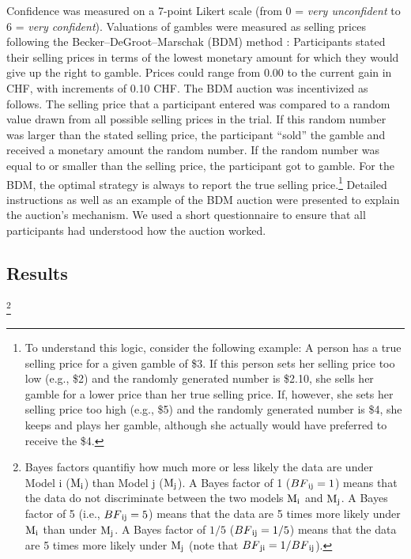 \documentclass[a4paper, man, natbib, floatsintext]{apa6}
\begin{document}
Confidence was measured on a 7-point Likert scale (from 0 = \textit{very unconfident} to 6 = \textit{very confident}). Valuations of gambles were measured as selling prices following the Becker--DeGroot--Marschak (BDM) method \citep{Becker1964}: Participants stated their selling prices in terms of the lowest monetary amount for which they would give up the right to gamble. Prices could range from 0.00 to the current gain in CHF, with increments of 0.10 CHF. The BDM auction was incentivized as follows. The selling price that a participant entered was compared to a random value drawn from all possible selling prices in the trial. If this random number was larger than the stated selling price, the participant ``sold'' the gamble and received a monetary amount  the random number. If the random number was equal to or smaller than the selling price, the participant got to gamble. For the BDM, the optimal strategy is always to report the true selling price.\footnote{\label{logic.BDM} 
To understand this logic, consider the following example: A person has a true selling price for a given gamble of \$3. If this person sets her selling price too low (e.g., \$2) and the randomly generated number is \$2.10, she sells her gamble for a lower price than her true selling price. If, however, she sets her selling price too high (e.g., \$5) and the randomly generated number is \$4, she keeps and plays her gamble, although she actually would have preferred to receive the \$4.
} Detailed instructions as well as an example of the BDM auction were presented to explain the auction's mechanism. We used a short questionnaire to ensure that all participants had understood how the auction worked.

\subsection{Results}
\footnote{Bayes factors quantifiy how much more or less likely the data are under Model i ($\mathrm{M}\textsubscript{i}$) than Model j ($\mathrm{M}\textsubscript{j}$). A Bayes factor of 1 ($BF\textsubscript{ij} = 1$) means that the data do not discriminate between the two models $\mathrm{M}\textsubscript{i}$ and $\mathrm{M}\textsubscript{j}$. A Bayes factor of 5 (i.e., $BF\textsubscript{ij} = 5$) means that the data are 5 times more likely under $\mathrm{M}\textsubscript{i}$ than under $\mathrm{M}\textsubscript{j}$. A Bayes factor of $1/5$ ($BF\textsubscript{ij} = 1/5$) means that the data are 5 times more likely under $\mathrm{M}\textsubscript{j}$ (note that $BF\textsubscript{ji} = 1/BF\textsubscript{ij}$).} 
\end{document}
